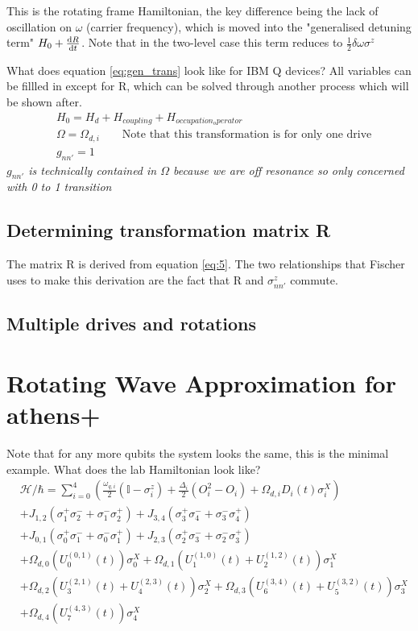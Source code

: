 \documentclass[12pt]{article}
\begin{document}
This is the rotating frame Hamiltonian, the key difference being the lack of oscillation on $\omega$ (carrier frequency), 
which is moved into the "generalised detuning term" $H_0 + \derivative{R}{t}$. Note that in the two-level case this term 
reduces to $\frac{1}{2} \delta \omega \sigma^z$

What does equation \eqref{eq:gen_trans} look like for IBM Q devices? All variables can be fillled in except for R,
which can be solved through another process which will be shown after.
\begin{align}
        & H_0 = H_d + H_{coupling} + H_{occupation_operator} \\
        & \Omega = \Omega_{d,i} \qquad \text{Note that this transformation is for only one drive} \\
        & g_{nn'} = 1
\end{align}
\textit{$g_{nn'}$ is technically contained in $\Omega$ because we are off resonance so only concerned with 0 to 1 transition}

\subsection{Determining transformation matrix R}
The matrix R is derived from equation \eqref{eq:5}. The two relationships that Fischer uses to make this derivation are the 
fact that R and $\sigma^z_{nn'}$ commute.

\subsection{Multiple drives and rotations}

\section{Rotating Wave Approximation for athens+}
Note that for any more qubits the system looks the same, this is the minimal example.
What does the lab Hamiltonian look like?
\begin{align} \label{eq:athens_hamiltonian}
         & \mathcal{H}/\hbar =
          \sum_{i=0}^{4}\left(\frac{\omega_{q,i}}{2}(\mathbb{I}-\sigma_i^{z})+\frac{\Delta_{i}}{2}(O_i^2-O_i)+\Omega_{d,i}D_i(t)\sigma_i^{X}\right) \\
         & + J_{1,2}(\sigma_{1}^{+}\sigma_{2}^{-}+\sigma_{1}^{-}\sigma_{2}^{+}) + J_{3,4}(\sigma_{3}^{+}\sigma_{4}^{-}+\sigma_{3}^{-}\sigma_{4}^{+}) \\ 
         & + J_{0,1}(\sigma_{0}^{+}\sigma_{1}^{-}+\sigma_{0}^{-}\sigma_{1}^{+}) + J_{2,3}(\sigma_{2}^{+}\sigma_{3}^{-}+\sigma_{2}^{-}\sigma_{3}^{+}) \\ 
         & + \Omega_{d,0}(U_{0}^{(0,1)}(t))\sigma_{0}^{X} + \Omega_{d,1}(U_{1}^{(1,0)}(t)+U_{2}^{(1,2)}(t))\sigma_{1}^{X} \\ 
         & + \Omega_{d,2}(U_{3}^{(2,1)}(t)+U_{4}^{(2,3)}(t))\sigma_{2}^{X} + \Omega_{d,3}(U_{6}^{(3,4)}(t)+U_{5}^{(3,2)}(t))\sigma_{3}^{X} \\
         & + \Omega_{d,4}(U_{7}^{(4,3)}(t))\sigma_{4}^{X} \\
\end{align}
\end{document}
